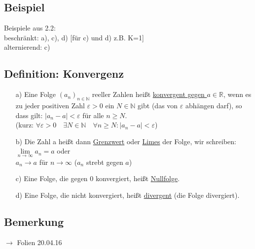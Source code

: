 \documentclass[12pt, titlepage]{article}
\newcommand{\R}{\mathds{R}}
\newcommand{\N}{\mathds{N}}
\newcommand{\infn}{n\rightarrow\infty}
\renewcommand{\*}{\cdot}
\renewcommand{\epsilon}{\varepsilon}
\begin{document}
	\subsection{Beispiel}
	Beispiele aus 2.2:\\
	beschränkt: a), c), d) [für c) und d) z.B. K=1] \\
	alternierend: c)
	\subsection{Definition: Konvergenz}
	\begin{itemize}
		\item[a)] Eine Folge $(a_n)_{n\in\N}$ reeller Zahlen heißt \underline{konvergent gegen $a\in\R$}, wenn es zu jeder positiven Zahl $\epsilon>0$ ein $N\in\N$ gibt (das von $\epsilon$ abhängen darf), so dass gilt: $|a_n-a|<\epsilon$ für alle $n\geq N$.\\
		(kurz: $\forall\epsilon>0\quad\exists N\in\N\quad\forall n\geq N\colon|a_n-a|<\epsilon$)
		\item[b)] Die Zahl a heißt dann \underline{Grenzwert} oder \underline{Limes} der Folge, wir schreiben:\\
		 $\lim\limits_{\infn}a_n=a$ oder\\
		 $a_n\rightarrow a$ für $\infn$ ($a_n$ strebt gegen $a$)
		 \item[c)] Eine Folge, die gegen $0$ konvergiert, heißt \underline{Nullfolge}.
		 \item[d)] Eine Folge, die nicht konvergiert, heißt \underline{divergent} (die Folge divergiert).
	\end{itemize}
	\subsection{Bemerkung}
	$\rightarrow$ Folien 20.04.16\\
\end{document}
